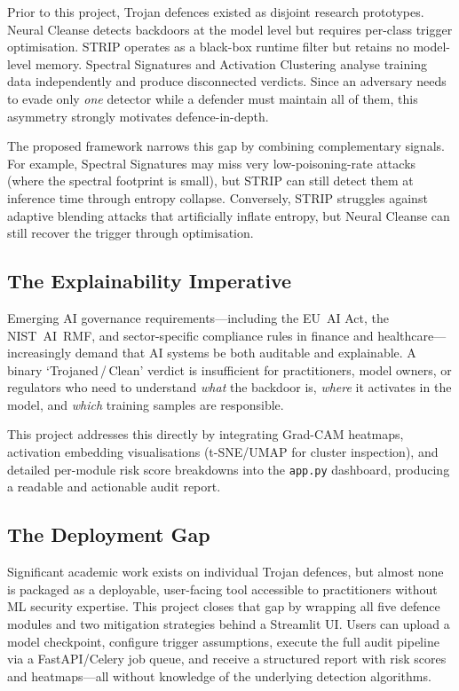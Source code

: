 \documentclass[12pt, letterpaper]{article}
\begin{document}
Prior to this project, Trojan defences existed as disjoint research
prototypes.  Neural Cleanse detects backdoors at the model level but requires
per-class trigger optimisation.  STRIP operates as a black-box runtime filter
but retains no model-level memory.  Spectral Signatures and Activation
Clustering analyse training data independently and produce disconnected verdicts.
Since an adversary needs to evade only \emph{one} detector while a defender
must maintain all of them, this asymmetry strongly motivates defence-in-depth.

The proposed framework narrows this gap by combining complementary signals.
For example, Spectral Signatures may miss very low-poisoning-rate attacks
(where the spectral footprint is small), but STRIP can still detect them at
inference time through entropy collapse.  Conversely, STRIP struggles against
adaptive blending attacks that artificially inflate entropy, but Neural Cleanse
can still recover the trigger through optimisation.

\subsection{The Explainability Imperative}

Emerging AI governance requirements---including the EU~AI Act, the NIST~AI~RMF,
and sector-specific compliance rules in finance and healthcare---increasingly
demand that AI systems be both auditable and explainable.  A binary
`Trojaned\,/\,Clean' verdict is insufficient for practitioners, model owners,
or regulators who need to understand \emph{what} the backdoor is, \emph{where}
it activates in the model, and \emph{which} training samples are responsible.

This project addresses this directly by integrating Grad-CAM heatmaps,
activation embedding visualisations (t-SNE/UMAP for cluster inspection),
and detailed per-module risk score breakdowns into the \texttt{app.py}
dashboard, producing a readable and actionable audit report.

\subsection{The Deployment Gap}

Significant academic work exists on individual Trojan defences, but almost
none is packaged as a deployable, user-facing tool accessible to practitioners
without ML security expertise.  This project closes that gap by wrapping all
five defence modules and two mitigation strategies behind a Streamlit UI.
Users can upload a model checkpoint, configure trigger assumptions, execute the
full audit pipeline via a FastAPI/Celery job queue, and receive a structured
report with risk scores and heatmaps---all without knowledge of the underlying
detection algorithms.
\end{document}

